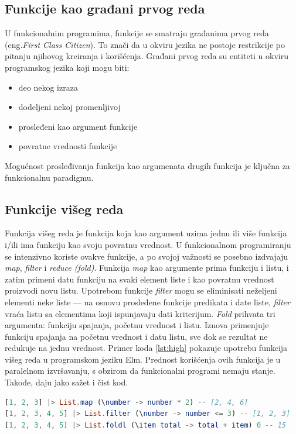 \documentclass[12pt,oneside]{memoir}
\begin{document}
\subsection{Funkcije kao građani prvog reda}
U funkcionalnim programima, funkcije se smatraju građanima prvog reda (eng.\emph{First Class Citizen}). To znači da u okviru jezika ne postoje restrikcije po pitanju njihovog kreiranja i korišćenja. Građani prvog reda su entiteti u okviru programskog jezika koji mogu biti:
\begin{itemize}
\item deo nekog izraza
\item dodeljeni nekoj promenljivoj
\item prosleđeni kao argument funkcije
\item povratne vrednosti funkcije
\end{itemize}
Mogućnost prosleđivanja funkcija kao argumenata drugih funkcija je ključna za funkcionalnu paradigmu. 

\subsection{Funkcije višeg reda}
Funkcija višeg reda je funkcija koja kao argument uzima jednu ili više funkcija i/ili ima funkciju kao svoju povratnu vrednost. U funkcionalnom programiranju se intenzivno koriste ovakve funkcije, a po svojoj važnosti se posebno izdvajaju \textit{map}, \textit{filter} i \textit{reduce (fold)}.  Funkcija \textit{map} kao argumente prima funkciju i listu, i zatim primeni datu funkciju na svaki element liste i kao povratnu vrednost proizvodi novu listu. Upotrebom funkcije \textit{filter} mogu se eliminisati neželjeni elementi neke liste --- na osnovu prosleđene funkcije predikata i date liste, \textit{filter} vraća listu sa elementima koji ispunjavaju dati kriterijum. \textit{Fold} prihvata tri argumenta: funkciju spajanja, početnu vrednost i listu. Iznova primenjuje funkciju spajanja na početnu vrednost i datu listu, sve dok se rezultat ne redukuje na jednu vrednost. Primer koda \ref{lst:high} pokazuje upotrebu funkcija višeg reda u programskom jeziku Elm. Prednost korišćenja ovih funkcija je u paralelnom izvršavanju, s obzirom da funkcionalni programi nemaju stanje. Takođe, daju jako sažet i čist kod.

\begin{lstlisting}[language=elm, caption={Funkcije višeg reda},captionpos=b, label={lst:high}]
[1, 2, 3] |> List.map (\number -> number * 2) -- [2, 4, 6]
[1, 2, 3, 4, 5] |> List.filter (\number -> number <= 3) -- [1, 2, 3]
[1, 2, 3, 4, 5] |> List.foldl (\item total -> total + item) 0 -- 15
\end{lstlisting}
\end{document}
